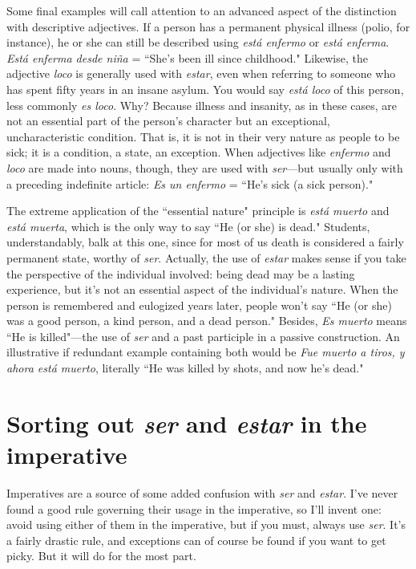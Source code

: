 Some final examples will call attention to an advanced aspect
of the distinction with descriptive adjectives. If a person has a permanent physical illness (polio, for instance), he or she can still be described using \emph{está enfermo} or \emph{está enferma}. \emph{Está enferma desde niña} =
``She's been ill since childhood." Likewise, the adjective \emph{loco} is generally used with \emph{estar}, even when referring to someone who has spent
fifty years in an insane asylum. You would say \emph{está loco} of this person,
less commonly \emph{es loco}. Why? Because illness and insanity, as in these
cases, are not an essential part of the person's character but an exceptional, uncharacteristic condition. That is, it is not in their very nature
as people to be sick; it is a condition, a state, an exception. When adjectives like \emph{enfermo} and \emph{loco} are made into nouns, though, they are
used with \emph{ser}---but usually only with a preceding indefinite article: \emph{Es
	un enfermo} = ``He's sick (a sick person)."

The extreme application of the ``essential nature" principle is
\emph{está muerto} and \emph{está muerta}, which is the only way to say ``He (or
she) is dead." Students, understandably, balk at this one, since for most
of us death is considered a fairly permanent state, worthy of \emph{ser}. Actually, the use of \emph{estar} makes sense if you take the perspective of the
individual involved: being dead may be a lasting experience, but it's
not an essential aspect of the individual's nature. When the person is
remembered and eulogized years later, people won't say ``He (or she)
was a good person, a kind person, and a dead person." Besides, \emph{Es
	muerto} means ``He is killed"---the use of \emph{ser} and a past participle in a
passive construction. An illustrative if redundant example containing
both would be \emph{Fue muerto a tiros, y ahora está muerto}, literally ``He
was killed by shots, and now he's dead."

\section{Sorting out \emph{ser} and \emph{estar} in the imperative}

Imperatives are a source of some added confusion with \emph{ser} and
\emph{estar}. I've never found a good rule governing their usage in the imperative, so I'll invent one: avoid using either of them in the imperative,
but if you must, always use \emph{ser}. It's a fairly drastic rule, and exceptions
can of course be found if you want to get picky. But it will do for the
most part.

